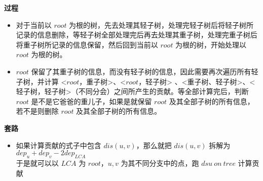 \documentclass[E:/GsjzTle/main/main.tex]{subfiles}
\begin{document}
\textbf{过程}

\begin{itemize}
\item
  对于当前以 \(root\)
  为根的树，先去处理其轻子树，处理完轻子树后将轻子树所记录的信息删除，等轻子树全部处理完后再去处理其重子树，处理完重子树后将重子树所记录的信息保留，然后回到当前以
  \(root\) 为根的树，开始处理以 \(root\) 为根的树。
\item
  \(root\)
  保留了其重子树的信息，而没有轻子树的信息，因此需要再次遍历所有轻子树，并计算
  \textless{}\(root\)，重子树\textgreater、\textless{}\(root\)，轻子树\textgreater{}
  、\textless 重子树、轻子树\textgreater、\textless 轻子树，轻子树\textgreater（不同分会）之间所产生的贡献。等全部计算完后，判断
  \(root\) 是不是它爸爸的重儿子，如果是就保留 \(root\)
  及其全部子树的所有信息，若不是则删除 \(root\) 及其全部子树的所有信息。
\end{itemize}

\textbf{套路}

\begin{itemize}
\item
  如果计算贡献的式子中包含 \(dis(u,v)\)，那么就把 \(dis(u,v)\) 拆解为
  \(dep_u+dep_v-2dep_{LCA}\)\\
  于是就可以以 \(LCA\) 为 \(root\)，\(u,v\) 为其不同分支中的点，跑
  \(dsu~on~tree\) 计算贡献
\end{itemize}
\end{document}

